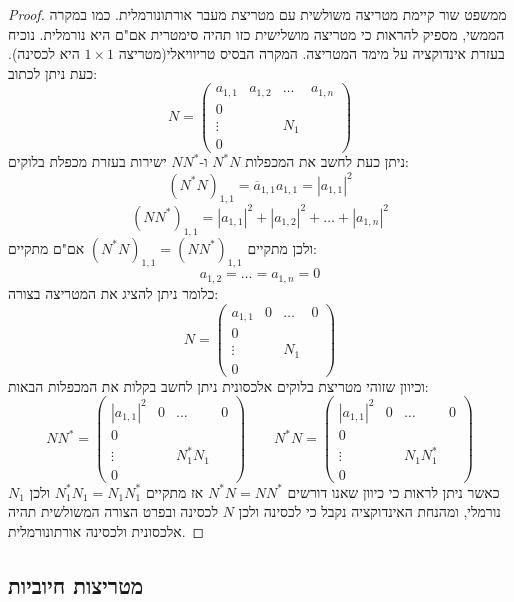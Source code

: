 \documentclass{tstextbook}
\begin{document}
\begin{proof}
ממשפט שור קיימת מטריצה משולשית עם מטריצת מעבר אורתונורמלית. כמו במקרה הממשי, מספיק להראות כי מטריצה מושלישית כזו תהיה סימטרית אם"ם היא נורמלית. נוכיח בעזרת אינדוקציה על מימד המטריצה. המקרה הבסיס טריוויאלי(מטריצה \(1\times1\) היא לכסינה). כעת ניתן לכתוב:
$$N=\left(\begin{array}{c|ccc} a_{1,1} & a_{1,2}  & \dots & a_{1,n} \\\hline 0 &  &  &  \\\vdots &  & N_{1} &  \\0 &  &  & 
\end{array}\right)$$
ניתן כעת לחשב את המכפלות \(N^{*}N\) ו-\(N N^{*}\) ישירות בעזרת מכפלת בלוקים:
$$(N^{*}N)_{1,1}=\overline{{{a}}}_{1,1}a_{1,1}=|a_{1,1}|^{2}$$$$(N N^{*})_{1,1}=|a_{1,1}|^{2}+|a_{1,2}|^{2}+\ldots+|a_{1,n}|^{2}$$
ולכן מתקיים \((N^{*}N)_{1,1}=(N N^{*})_{1,1}\) אם"ם מתקיים:
$$a_{1,2}=\ldots=a_{1,n}=0$$
כלומר ניתן להציג את המטריצה בצורה:
$$N=\left(\begin{array}{c|ccc} a_{1,1} & 0   & \dots & 0 \\\hline 0 &  &  &  \\\vdots &  & N_{1} &  \\0 &  &  & 
\end{array}\right)$$
וכיוון שזוהי מטריצת בלוקים אלכסונית ניתן לחשב בקלות את המכפלות הבאות:
$$NN^{*}=\left(\begin{array}{c|ccc} |a_{1,1}|^{2} & 0  & \dots & 0 \\\hline 0 &  &  &  \\\vdots &  & N_{1}^{*}N_{1} &  \\0 &  &  & \end{array}\right)\qquad N^{*}N=\left(\begin{array}{c|ccc} |a_{1,1}|^{2} & 0  & \dots & 0 \\\hline 0 &  &  &  \\\vdots &  & N_{1}N_{1}^{*} &  \\0 &  &  & 
\end{array}\right)$$
כאשר ניתן לראות כי כיוון שאנו דורשים \(N^{*}N=N N^{*}\) אז מתקיים \(N_{1}^{*}N_{1}=N_{1} N_{1}^{*}\) ולכן \(N_{1}\) נורמלי, ומהנחת האינדוקציה נקבל כי לכסינה ולכן \(N\) לכסינה ובפרט הצורה המשולשית תהיה אלכסונית ולכסינה אורתונורמלית.

\end{proof}
\subsection{מטריצות חיוביות}
\end{document}
